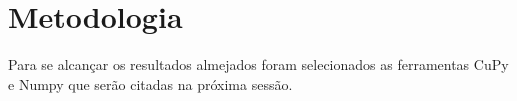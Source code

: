 \section{Metodologia}

Para se alcançar os resultados almejados foram selecionados as ferramentas CuPy e Numpy que serão citadas
na próxima sessão.
